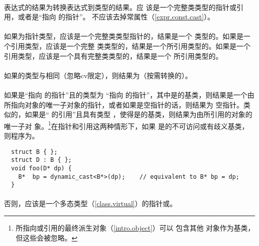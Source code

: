 \paragraph{} %
表达式的结果为转换表达式到类型的结果。应
该是一个完整类类型的指针或引用，或者是``指向 的指针''。
不应该去掉常属性（\ref{expr.const.cast}）。

\paragraph{} %
如果为指针类型，应该是一个完整类类型指针的\prvalue{}，结果是一个
类型的\prvalue{}。如果是一个\lvalue{}引用类型，应该是一个完整
类类型的\lvalue{}，结果是一个所引用类型的\lvalue{}。如果是一个
\rvalue{}引用类型，应该是一个具有完整类类型的\glvalue{}，结果是一个
所引用类型的\xvalue{}。

\paragraph{} %
如果的类型与相同（忽略cv限定），则结果为（按需转换的）。

\paragraph{} %
如果是``指向 的指针''且的类型为
``指向 的指针''，其中是的基类，则结果是一个由
所指向对象的唯一子对象的指针，或者如果是空指针的话，则结果为
空指针。类似的，如果是`` 的引用''且具有类型
，使得是的基类，则结果为由所引用的对象的唯一子对
象。\footnote{所指向或引用的最终派生对象（\ref{intro.object}）可以
包含其他 对象作为基类，但这些会被忽略。}在指针和引用这两种情形下，如果
是的不可访问或有歧义基类，则程序为\illform{}。

\begin{example}
  \begin{lstlisting}
  struct B { };
  struct D : B { };
  void foo(D* dp) {
    B*  bp = dynamic_cast<B*>(dp);    // equivalent to B* bp = dp;
  }
  \end{lstlisting}
\end{example}

\paragraph{} %
否则，应该是一个多态类型（\ref{class.virtual}）的指针或\glvalue{}。

